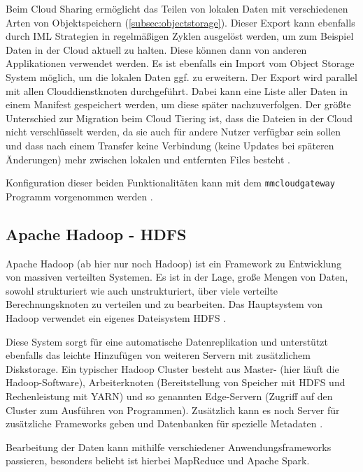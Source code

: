 Beim Cloud Sharing ermöglicht das Teilen von lokalen Daten mit verschiedenen Arten von Objektspeichern (\autoref{subsec:objectstorage}). Dieser Export kann ebenfalls durch IML Strategien in regelmäßigen Zyklen ausgelöst werden, um zum Beispiel Daten in der Cloud aktuell zu halten. Diese können dann von anderen Applikationen verwendet werden. Es ist ebenfalls ein Import vom Object Storage System möglich, um die lokalen Daten ggf. zu erweitern.
Der Export wird parallel mit allen Clouddienstknoten durchgeführt. Dabei kann eine Liste aller Daten in einem Manifest gespeichert werden, um diese später nachzuverfolgen.
Der größte Unterschied zur Migration beim Cloud Tiering ist, dass die Dateien in der Cloud nicht verschlüsselt werden, da sie auch für andere Nutzer verfügbar sein sollen und dass nach einem Transfer keine Verbindung (keine Updates bei späteren Änderungen) mehr zwischen lokalen und entfernten Files besteht \parencite[S. 109]{ibm.2017}.

Konfiguration dieser beiden Funktionalitäten kann mit dem \lstinline|mmcloudgateway| Programm vorgenommen werden \parencite{ibmadmin.2017}.

\subsection{Apache Hadoop - HDFS}

Apache Hadoop (ab hier nur noch Hadoop) ist ein Framework zu Entwicklung von massiven verteilten Systemen. Es ist in der Lage, große Mengen von Daten, sowohl strukturiert wie auch unstrukturiert, über viele verteilte Berechnungsknoten zu verteilen und zu bearbeiten. Das Hauptsystem von Hadoop verwendet ein eigenes Dateisystem \ac{HDFS} \parencite[Kap. I,1]{alapati.2016}.

Diese System sorgt für eine automatische Datenreplikation und unterstützt ebenfalls das leichte Hinzufügen von weiteren Servern mit zusätzlichem Diskstorage. Ein typischer Hadoop Cluster besteht aus Master- (hier läuft die Hadoop-Software), Arbeiterknoten (Bereitstellung von Speicher mit \ac{HDFS} und Rechenleistung mit \ac{YARN}) und so genannten Edge-Servern (Zugriff auf den Cluster zum Ausführen von Programmen). Zusätzlich kann es noch Server für zusätzliche Frameworks geben und Datenbanken für spezielle Metadaten \parencite[Kap. I,1]{alapati.2016}.

Bearbeitung der Daten kann mithilfe verschiedener Anwendungsframeworks passieren, besonders beliebt ist hierbei MapReduce und Apache Spark.

